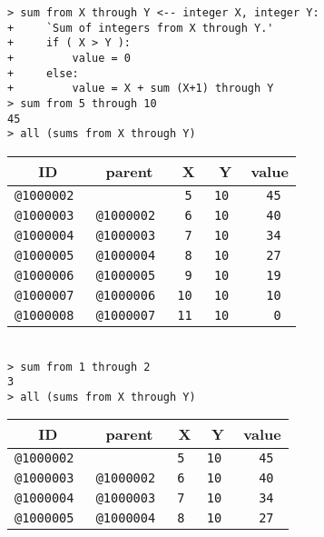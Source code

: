 \documentclass[12pt]{article}
\newenvironment{indpar}[1][0.3in]%
	{\begin{list}{}%
		     {\setlength{\itemsep}{0in}%
		      \setlength{\topsep}{0in}%
		      \setlength{\parsep}{1ex}%
		      \setlength{\labelwidth}{#1}%
		      \setlength{\leftmargin}{#1}%
		      \addtolength{\leftmargin}{\labelsep}}%
	 \item}%
	{\end{list}}
\begin{document}
\begin{indpar}
\verb|> sum from X through Y <-- integer X, integer Y:| \\
\verb|+     `Sum of integers from X through Y.'| \\
\verb|+     if ( X > Y ):| \\
\verb|+         value = 0| \\
\verb|+     else:| \\
\verb|+         value = X + sum (X+1) through Y| \\
\verb|> sum from 5 through 10| \\
\verb|45| \\
\verb|> all (sums from X through Y)| \\
\begin{tabular}{|r|r|r|r|r|}
\hline
\multicolumn{1}{|c}{\bf ID} &
\multicolumn{1}{|c}{\bf parent} &
\multicolumn{1}{|c}{\bf X} &
\multicolumn{1}{|c}{\bf Y} &
\multicolumn{1}{|c|}{\bf value} \\
\hline
\tt @1000002 &       		& \tt 5	& \tt	10	& \tt 45 \\
\tt @1000003 & \tt @1000002	& \tt 6	& \tt	10	& \tt 40 \\
\tt @1000004 & \tt @1000003	& \tt 7	& \tt	10	& \tt 34 \\
\tt @1000005 & \tt @1000004	& \tt 8	& \tt	10	& \tt 27 \\
\tt @1000006 & \tt @1000005	& \tt 9	& \tt	10	& \tt 19 \\
\tt @1000007 & \tt @1000006	& \tt 10	& \tt	10	& \tt 10 \\
\tt @1000008 & \tt @1000007	& \tt 11	& \tt	10	& \tt 0 \\
\hline
\end{tabular} \\[0.5ex]
\verb|> sum from 1 through 2| \\
\verb|3| \\
\verb|> all (sums from X through Y)| \\
\begin{tabular}{|r|r|r|r|r|}
\hline
\multicolumn{1}{|c}{\bf ID} &
\multicolumn{1}{|c}{\bf parent} &
\multicolumn{1}{|c}{\bf X} &
\multicolumn{1}{|c}{\bf Y} &
\multicolumn{1}{|c|}{\bf value} \\
\hline
\tt @1000002 &       		& \tt 5		& \tt	10	& \tt 45 \\
\tt @1000003 & \tt @1000002	& \tt 6		& \tt	10	& \tt 40 \\
\tt @1000004 & \tt @1000003	& \tt 7		& \tt	10	& \tt 34 \\
\tt @1000005 & \tt @1000004	& \tt 8		& \tt	10	& \tt 27 \\

\end{tabular}
\end{indpar}
\end{document}
